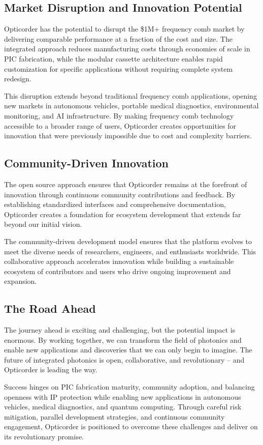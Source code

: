 \documentclass[11pt,a4paper]{article}
\begin{document}
\subsection{Market Disruption and Innovation Potential}
Opticorder has the potential to disrupt the \$1M+ frequency comb market by delivering comparable performance at a fraction of the cost and size. The integrated approach reduces manufacturing costs through economies of scale in PIC fabrication, while the modular cassette architecture enables rapid customization for specific applications without requiring complete system redesign.

This disruption extends beyond traditional frequency comb applications, opening new markets in autonomous vehicles, portable medical diagnostics, environmental monitoring, and AI infrastructure. By making frequency comb technology accessible to a broader range of users, Opticorder creates opportunities for innovation that were previously impossible due to cost and complexity barriers.

\subsection{Community-Driven Innovation}
The open source approach ensures that Opticorder remains at the forefront of innovation through continuous community contributions and feedback. By establishing standardized interfaces and comprehensive documentation, Opticorder creates a foundation for ecosystem development that extends far beyond our initial vision.

The community-driven development model ensures that the platform evolves to meet the diverse needs of researchers, engineers, and enthusiasts worldwide. This collaborative approach accelerates innovation while building a sustainable ecosystem of contributors and users who drive ongoing improvement and expansion.

\subsection{The Road Ahead}
The journey ahead is exciting and challenging, but the potential impact is enormous. By working together, we can transform the field of photonics and enable new applications and discoveries that we can only begin to imagine. The future of integrated photonics is open, collaborative, and revolutionary – and Opticorder is leading the way.

Success hinges on PIC fabrication maturity, community adoption, and balancing openness with IP protection while enabling new applications in autonomous vehicles, medical diagnostics, and quantum computing. Through careful risk mitigation, parallel development strategies, and continuous community engagement, Opticorder is positioned to overcome these challenges and deliver on its revolutionary promise.
\end{document}

